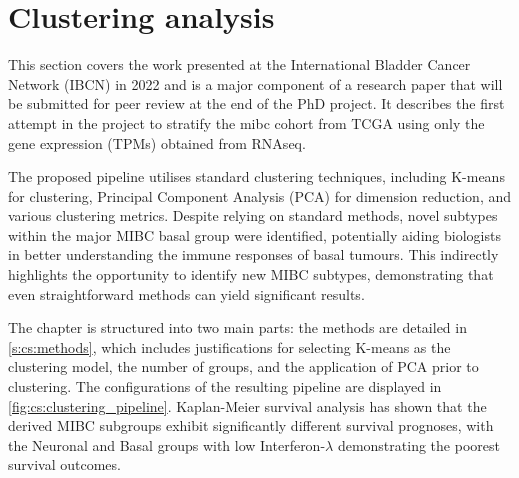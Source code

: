 \chapter{Clustering analysis} \label{s:clustering_analysis}

\vspace{3mm}
\vspace{3mm}


This section covers the work presented at the International Bladder Cancer Network (IBCN) in 2022 and is a major component of a research paper that will be submitted for peer review at the end of the PhD project. It describes the first attempt in the project to stratify the \acrfull{mibc} cohort from TCGA using only the gene expression (TPMs) obtained from RNAseq.

The proposed pipeline utilises standard clustering techniques, including K-means for clustering, Principal Component Analysis (PCA) for dimension reduction, and various clustering metrics. Despite relying on standard methods, novel subtypes within the major MIBC basal group were identified, potentially aiding biologists in better understanding the immune responses of basal tumours. This indirectly highlights the opportunity to identify new MIBC subtypes, demonstrating that even straightforward methods can yield significant results.



The chapter is structured into two main parts: the methods are detailed in \cref{s:cs:methods}, which includes justifications for selecting K-means as the clustering model, the number of groups, and the application of PCA prior to clustering. The configurations of the resulting pipeline are displayed in \cref{fig:cs:clustering_pipeline}. Kaplan-Meier survival analysis has shown that the derived MIBC subgroups exhibit significantly different survival prognoses, with the Neuronal and Basal groups with low Interferon-$\lambda$ demonstrating the poorest survival outcomes.

